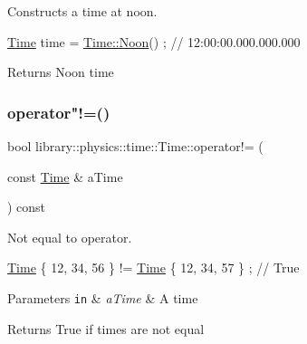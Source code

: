 Constructs a time at noon. 


\begin{DoxyCode}
\hyperlink{classlibrary_1_1physics_1_1time_1_1_time_a46a4b9be1451041ae65332f04db21c4b}{Time} time = \hyperlink{classlibrary_1_1physics_1_1time_1_1_time_a3d67891fe71e3b5ba62c6517477e7698}{Time::Noon}() ; \textcolor{comment}{// 12:00:00.000.000.000}
\end{DoxyCode}


\begin{DoxyReturn}{Returns}
Noon time 
\end{DoxyReturn}
\mbox{\label{classlibrary_1_1physics_1_1time_1_1_time_af2caee50ce2d4abd157645052a090db1}} 
\subsubsection{\texorpdfstring{operator"!=()}{operator!=()}}
{\footnotesize\ttfamily bool library\+::physics\+::time\+::\+Time\+::operator!= (\begin{DoxyParamCaption}\item[{const \hyperlink{classlibrary_1_1physics_1_1time_1_1_time}{Time} \&}]{a\+Time }\end{DoxyParamCaption}) const}



Not equal to operator. 


\begin{DoxyCode}
\hyperlink{classlibrary_1_1physics_1_1time_1_1_time_a46a4b9be1451041ae65332f04db21c4b}{Time} \{ 12, 34, 56 \}  != \hyperlink{classlibrary_1_1physics_1_1time_1_1_time_a46a4b9be1451041ae65332f04db21c4b}{Time} \{ 12, 34, 57 \} ; \textcolor{comment}{// True}
\end{DoxyCode}



\begin{DoxyParams}[1]{Parameters}
\mbox{\tt in}  & {\em a\+Time} & A time \\
\hline
\end{DoxyParams}
\begin{DoxyReturn}{Returns}
True if times are not equal 
\end{DoxyReturn}
\mbox{\label{classlibrary_1_1physics_1_1time_1_1_time_ac566f208b63b58b5dae1328b4c24fbe6}} 
